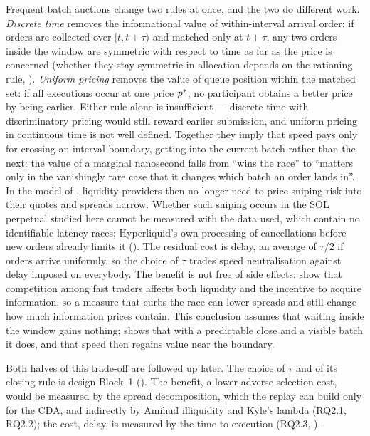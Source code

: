 Frequent batch auctions change two rules at once, and the two do
different work. \emph{Discrete time} removes the informational value of
within-interval arrival order: if orders are collected over $[t,
t+\tau)$ and matched only at $t+\tau$, any two orders inside the window
are symmetric with respect to time as far as the price is concerned
(whether they stay symmetric in allocation depends on the rationing rule,
). \emph{Uniform pricing} removes the
value of queue position within the matched set: if all executions occur
at one price $p^{\ast}$, no participant obtains a better price by being
earlier. Either rule alone is insufficient --- discrete time with
discriminatory pricing would still reward earlier submission, and uniform
pricing in continuous time is not well defined. Together they imply that
speed pays only for crossing an interval boundary, getting into the
current batch rather than the next: the value of a marginal nanosecond
falls from ``wins the race'' to ``matters only in the vanishingly rare
case that it changes which batch an order lands in''. In the model of
\citet{budish2015hft}, liquidity providers then no longer need to price
sniping risk into their quotes and spreads narrow. Whether such sniping
occurs in the SOL perpetual studied here cannot be measured with the data
used, which contain no identifiable latency races; Hyperliquid's own
processing of cancellations before new orders already limits it
(). The residual cost is
delay, an average of $\tau/2$ if orders arrive uniformly, so the choice of
$\tau$ trades speed neutralisation against delay imposed on everybody.
The benefit is not free of side effects: \citet{baldauf2020hft} show that
competition among fast traders affects both liquidity and the incentive to
acquire information, so a measure that curbs the race can lower spreads
and still change how much information prices contain.
This conclusion assumes that waiting inside the window gains nothing;
 shows that with a predictable close and a
visible batch it does, and that speed then regains value near the
boundary.

Both halves of this trade-off are followed up later. The choice of $\tau$
and of its closing rule is design Block~1 (). The
benefit, a lower adverse-selection cost, would be measured by the spread
decomposition, which the replay can build only for the CDA, and
indirectly by Amihud illiquidity and Kyle's lambda (RQ2.1, RQ2.2); the
cost, delay, is measured by the time to execution (RQ2.3,
).

